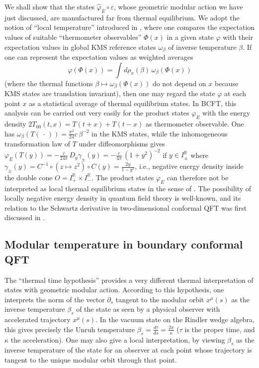 \documentclass[12pt]{article}
\def\eps{\varepsilon}
\def \RR {{\mathbb R}}
\def\inv{^{-1}}
\def\be{\begin{equation}} \def\bea{\begin{eqnarray}}
\def\ee{\end{equation}}\def\ea{\end{array}}
\newcommand{\dd}[2]{\frac{d{#2}}{d{#1}}}
\begin{document}
We shall show that the states $\widehat\varphi_E\circ\eps$, whose
geometric modular action we have just discussed, are manufactured
far from thermal equilibrium. We adopt the notion of ``local
temperature'' introduced in \cite{BOR}, where one compares the
expectation values of suitable ``thermometer observables'' $\Phi(x)$ 
in a given state $\varphi$ with their expectation values in global KMS
reference states $\omega_\beta$ of inverse temperature $\beta$. If one
can represent the expectation values as weighted averages   
\be
\varphi(\Phi(x)) = \int d\rho_x(\beta)\, \omega_\beta(\Phi(x))
\ee
(where the thermal functions $\beta\mapsto \omega_\beta(\Phi(x))$ do
not depend on $x$ because KMS states are translation invariant), then
one may regard the state $\varphi$ at each point $x$ as a statistical
average of thermal equilibrium states. In BCFT, this analysis can
be carried out very easily for the product states $\varphi_E$ with the
energy density $2T_{00}(t,x)=T(t+x)+T(t-x)$ as thermometer
observable. One has $\omega_\beta(T(\,\cdot\,)) = 
\frac{\pi^2}{24}c\,\beta^{-2}$ in the KMS states, while the
inhomogeneous transformation law of $T$ under diffeomorphisms gives
$\varphi_E(T(y)) = -\frac c{24\pi}\, D_y\gamma_\pm(y) = 
-\frac c{4\pi} \, (1+y^2)^{-2}$ if $y\in I^\RR_\pm$ where
$\gamma_\pm(y) = C\inv\circ (z\mapsto z^2)\circ C(y)=\frac{2y}{1-y^2}$, 
i.e., negative energy density inside the double cone $O=I^\RR_+\times
I^\RR_-$. The product states $\varphi_E$ can therefore not be interpreted 
as local thermal equilibrium states in the sense of \cite{BOR}. The
possibility of locally negative energy density in quantum field theory
is well-known, and its relation to the Schwartz derivative in
two-dimensional conformal QFT was first discussed in \cite{F}.      





\subsection{Modular temperature in boundary conformal QFT} 
\label{sec:modtemp}

The ``thermal time hypothesis'' \cite{CR} provides a very different
thermal interpretation of states with geometric modular action. 
According to this hypothesis, one interprets the norm of the vector
$\partial_s$ tangent to the modular orbit $x^\mu(s)$ as the inverse
temperature $\beta_s$ of the state as seen by a physical observer with
accelerated trajectory $x^\mu(s)$. In the vacuum state on the Rindler
wedge algebra, this gives precisely the Unruh temperature $\beta_s=\dd
s\tau =\frac{2\pi}{\kappa}$ ($\tau$ is the proper time, and $\kappa$
the acceleration). One may also give a local interpretation, by viewing
$\beta_s$  as the inverse temperature of the state for an observer at
each point whose trajectory is tangent to the unique modular orbit
through that point. 
\end{document}
